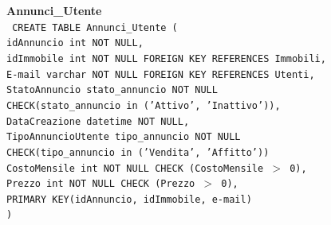 \documentclass[a4paper,12pt]{report}
\begin{document}
                \noindent
                {\large \textbf{Annunci\_Utente}} \\
                \texttt{
                    CREATE TABLE Annunci\_Utente ( \\
                    \null\quad\quad idAnnuncio          int             NOT NULL, \\ 
                    \null\quad\quad idImmobile int NOT NULL FOREIGN KEY REFERENCES Immobili, \\
                    \null\quad\quad E-mail varchar NOT NULL FOREIGN KEY REFERENCES Utenti, \\
                    \null\quad\quad StatoAnnuncio       stato\_annuncio         NOT NULL \\
                            \null\qquad\qquad CHECK(stato\_annuncio in ('Attivo', 'Inattivo')), \\
                    \null\quad\quad DataCreazione       datetime        NOT NULL, \\
                    \null\quad\quad TipoAnnuncioUtente  tipo\_annuncio  NOT NULL \\
                            \null\qquad\qquad CHECK(tipo\_annuncio in ('Vendita', 'Affitto')) \\
                    \null\quad\quad CostoMensile        int             NOT NULL CHECK (CostoMensile $>$ 0), \\
                    \null\quad\quad Prezzo              int             NOT NULL CHECK (Prezzo $>$ 0),\\
                    \null\quad\quad PRIMARY KEY(idAnnuncio, idImmobile, e-mail) \\
                    )
                } \\
\end{document}
